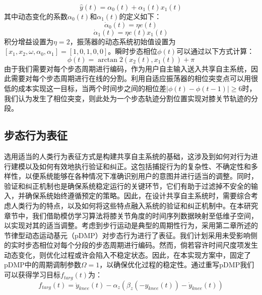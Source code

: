 \begin{equation}
\label{deqn_ex4}
\hat y(t) = {\alpha _0}(t) + {\alpha _1}(t){x_1}(t)
\end{equation}    
其中动态变化的系数${\alpha _0}(t)$和${\alpha _1}(t)$的定义如下：
\begin{equation}
\label{deqn_ex5}
{\dot \alpha _0}(t) = \eta e(t)
\end{equation}   
\begin{equation}
\label{deqn_ex6}
{\dot \alpha _1}(t) = \eta e(t){x_1}(t)
\end{equation} 
积分增益设置为$\eta=2$，振荡器的动态系统初始值设置为$[{x_1},{x_2},\omega ,{\alpha _0},{\alpha _1}] = [1,0,1,0,0]$。瞬时步态相位$\phi (t)$可以通过以下方式计算：
\begin{equation}
\label{deqn_ex7}
\phi (t) = \arctan 2({x_2}(t),{x_1}(t)) + \pi 
\end{equation}    
由于我们需要对每个步态周期进行编码，作为用户自主输入送入共享自主系统，因此需要对每个步态周期进行在线的分割。利用自适应振荡器的相位突变点可以用很低的成本实现这一目标，当两个时间步之间的相位差$\lvert \phi (t) - \phi (t - 1) \rvert \geq 6$时，我们认为发生了相位突变，则此处为一个步态轨迹分割位置实现对膝关节轨迹的分段。  

\subsection{步态行为表征} 选用适当的人类行为表征方式是构建共享自主系统的基础，这涉及到如何对行为进行建模以及如何有效地执行验证和纠正。这包括捕捉行为的复杂性、不确定性和多样性，以便系统能够在各种情况下准确识别用户的意图并进行适当的调整。同时，验证和纠正机制也是确保系统稳定运行的关键环节，它们有助于过滤掉不安全的输入，并确保系统始终遵循预定的策略。因此，在设计共享自主系统时，需要综合考虑人类行为的特点，以及如何将这些特点融入系统的验证和纠正机制中。在本研究章节中，我们借助模仿学习算法\cite{schaalImitationLearningRoute1999}将膝关节角度的时间序列数据映射至低维子空间，以实现对其的适当调整。考虑到步行运动是典型的周期性行为，采用第二章所述的节律型动态运动基元（pDMP）\cite{ijspeertDynamicalMovementPrimitives2013a,gamsOnlineLearningModulation2009}对步态行为进行了表征。我们计划采用未受影响侧的实时步态相位对每个分段的步态周期进行编码。然而，倘若容许时间尺度项发生动态变化，则优化过程或许会陷入不稳定状态。因此，在本实现方案中，固定了pDMP中的周期调制参数$\Omega  = 1$，以确保优化过程的稳定性。通过重写pDMP我们可以获得学习目标${f_{targ}}(t)$为：
\begin{equation}
  {f_{targ}}(t) = {\ddot y_{knee}}(t) - {\alpha _z}({\beta _z}( - {y_{knee}}(t)) - {\dot y_{knee}}(t))
  \label{eq:5-1}
\end{equation}    

